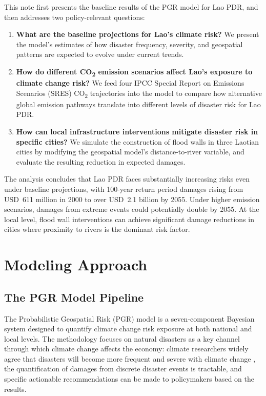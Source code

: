 \documentclass[11pt,a4paper]{article}
\begin{document}
This note first presents the baseline results of the PGR model for Lao PDR, and then addresses two policy-relevant questions:

\begin{enumerate}[leftmargin=2em]
  \item \textbf{What are the baseline projections for Lao's climate risk?} We present the model's estimates of how disaster frequency, severity, and geospatial patterns are expected to evolve under current trends.

  \item \textbf{How do different CO\textsubscript{2} emission scenarios affect Lao's exposure to climate change risk?} We feed four IPCC Special Report on Emissions Scenarios (SRES) CO\textsubscript{2} trajectories into the model to compare how alternative global emission pathways translate into different levels of disaster risk for Lao PDR.

  \item \textbf{How can local infrastructure interventions mitigate disaster risk in specific cities?} We simulate the construction of flood walls in three Laotian cities by modifying the geospatial model's distance-to-river variable, and evaluate the resulting reduction in expected damages.
\end{enumerate}

The analysis concludes that Lao PDR faces substantially increasing risks even under baseline projections, with 100-year return period damages rising from USD~611 million in 2000 to over USD~2.1 billion by 2055. Under higher emission scenarios, damages from extreme events could potentially double by 2055. At the local level, flood wall interventions can achieve significant damage reductions in cities where proximity to rivers is the dominant risk factor.

\section{Modeling Approach}

\subsection{The PGR Model Pipeline}

The Probabilistic Geospatial Risk (PGR) model is a seven-component Bayesian system designed to quantify climate change risk exposure at both national and local levels. The methodology focuses on natural disasters as a key channel through which climate change affects the economy: climate researchers widely agree that disasters will become more frequent and severe with climate change \cite{ipcc2023ar6, nordhaus2019}, the quantification of damages from discrete disaster events is tractable, and specific actionable recommendations can be made to policymakers based on the results.
\end{document}
